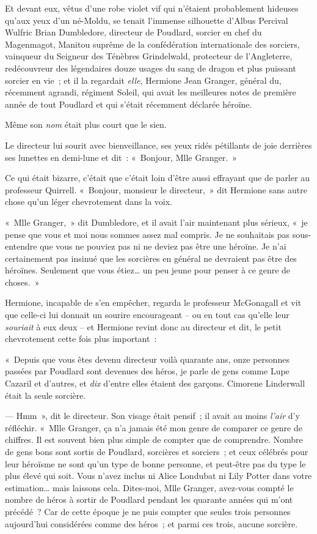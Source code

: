 Et devant eux, vêtus d'une robe violet vif qui n'étaient probablement hideuses qu'aux yeux d'un né-Moldu, se tenait l'immense silhouette d'Albus Percival Wulfric Brian Dumbledore, directeur de Poudlard, sorcier en chef du Magenmagot, Manitou suprême de la confédération internationale des sorciers, vainqueur du Seigneur des Ténèbres Grindelwald, protecteur de l'Angleterre, redécouvreur des légendaires douze usages du sang de dragon et plus puissant sorcier en vie~; et il la regardait \emph{elle}, Hermione Jean Granger, général du, récemment agrandi, régiment Soleil, qui avait les meilleures notes de première année de tout Poudlard et qui s'était récemment déclarée héroïne.

Même son \emph{nom} était plus court que le sien.

Le directeur lui sourit avec bienveillance, ses yeux ridés pétillants de joie derrières ses lunettes en demi-lune et dit~: «~Bonjour, Mlle Granger.~»

Ce qui était bizarre, c'était que c'était loin d'être aussi effrayant que de parler au professeur Quirrell.
«~Bonjour, monsieur le directeur,~» dit Hermione sans autre chose qu'un léger chevrotement dans la voix.

«~Mlle Granger,~» dit Dumbledore, et il avait l'air maintenant plus sérieux, «~je pense que vous et moi nous sommes assez mal compris.
Je ne souhaitais pas sous-entendre que vous ne pouviez pas ni ne deviez pas être une héroïne.
Je n'ai certainement pas insinué que les sorcières en général ne devraient pas être des héroïnes.
Seulement que vous étiez… un peu jeune pour penser à ce genre de choses.~»

Hermione, incapable de s'en empêcher, regarda le professeur McGonagall et vit que celle-ci lui donnait un sourire encourageant -- ou en tout cas qu'elle leur \emph{souriait} à eux deux -- et Hermione revint donc au directeur et dit, le petit chevrotement cette fois plus important~:

«~Depuis que vous êtes devenu directeur voilà quarante ans, onze personnes passées par Poudlard sont devenues des héros, je parle de gens comme Lupe Cazaril et d'autres, et \emph{dix} d'entre elles étaient des garçons.
Cimorene Linderwall était la seule sorcière.

--- Hmm~», dit le directeur.
Son visage était pensif~; il avait au moins \emph{l'air} d'y réfléchir.
«~Mlle Granger, ça n'a jamais été mon genre de comparer ce genre de chiffres.
Il est souvent bien plus simple de compter que de comprendre.
Nombre de gens bons sont sortis de Poudlard, sorcières et sorciers~; et ceux célébrés pour leur héroïsme ne sont qu'un type de bonne personne, et peut-être pas du type le plus élevé qui soit.
Vous n'avez inclus ni Alice Londubat ni Lily Potter dans votre estimation… mais laissons cela.
Dites-moi, Mlle Granger, avez-vous compté le nombre de héros à sortir de Poudlard pendant les quarante années qui m'ont précédé~?
Car de cette époque je ne puis compter que seules trois personnes aujourd'hui considérées comme des héros~; et parmi ces trois, aucune sorcière.

